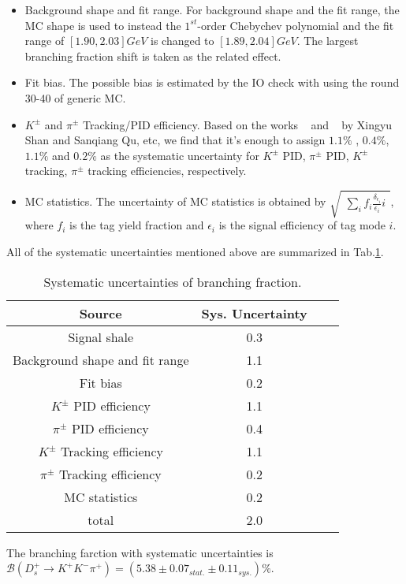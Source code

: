 {\begin{itemize}
        \item Background shape and fit range. For background shape and the fit range, the MC shape is used to instead the $1^{st}$-order Chebychev polynomial and the fit range of $[1.90, 2.03]GeV$ is changed to $[1.89, 2.04]GeV$. 
            The largest branching fraction shift is taken as the related effect.
        
        \item Fit bias. The possible bias is estimated by the IO check with using the round 30-40 of generic MC.
            
        \item $K^{\pm}$ and $\pi^{\pm}$ Tracking/PID efficiency. Based on the works ~\cite{PID} and ~\cite{Tracking} by Xingyu Shan and Sanqiang Qu, etc, 
            we find that it's enough to assign $1.1\%$ , $0.4\%$, $1.1\%$ and $0.2\%$ as the systematic uncertainty for $K^{\pm}$ PID, $\pi^{\pm}$ PID,  $K^{\pm}$ tracking, $\pi^{\pm}$ tracking efficiencies, respectively.
    
    \item MC statistics. The uncertainty of MC statistics is obtained by $\sqrt{ \begin{matrix} \sum_{i} f_{i}\frac{\delta_{\epsilon_{i}}}{\epsilon_{i}}i\end{matrix}}$, where $f_{i}$ is the tag yield fraction and $\epsilon_{i}$ is the signal efficiency of tag mode $i$.
    \end{itemize}

    All of the systematic uncertainties mentioned above are summarized in Tab.\ref{BF-Sys}.
    \begin{table}
        \caption{Systematic uncertainties of branching fraction.}
        \label{BF-Sys}
        \begin{center}
            \begin{tabular}{cccc}
                \toprule
                Source   & Sys. Uncertainty\\
                \hline
                Signal shale                        & 0.3 \\
                Background shape and fit range      & 1.1 \\
                Fit bias                            & 0.2 \\
                $K^{\pm}$ PID efficiency            & 1.1 \\
                $\pi^{\pm}$ PID efficiency          & 0.4 \\
                $K^{\pm}$ Tracking efficiency       & 1.1 \\
                $\pi^{\pm}$ Tracking efficiency     & 0.2 \\
                MC statistics                       & 0.2 \\
                \hline
                total                               & 2.0 \\
                \bottomrule
            \end{tabular}
        \end{center}
    \end{table}

    The branching farction with systematic uncertainties is $\mathcal{B}(D_{s}^{+} \rightarrow K^{+}K^{-}\pi^{+})=(5.38\pm0.07_{stat.}\pm0.11_{sys.})\%$.




}
